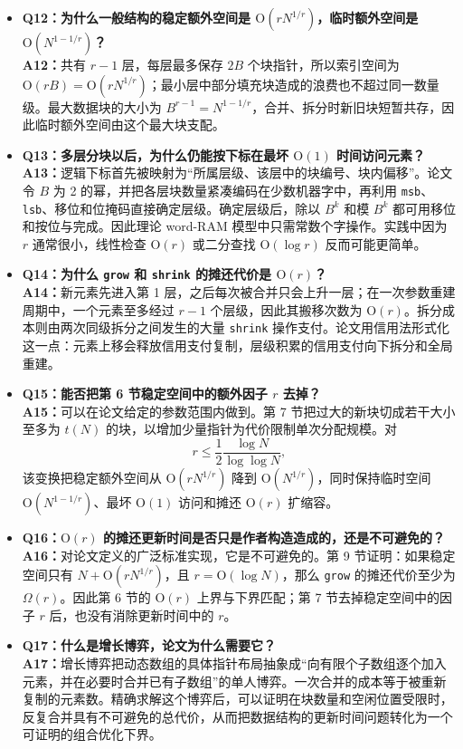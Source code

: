 \documentclass[UTF8,11pt,a4paper]{ctexart}
\newcommand{\op}[1]{\textnormal{\texttt{#1}}}
\newcommand{\Oh}{\mathrm{O}}
\begin{document}
\begin{itemize}[label={},leftmargin=0pt,itemsep=1.0em,topsep=0.5em]
  \item \textbf{Q12：为什么一般结构的稳定额外空间是 $\Oh(rN^{1/r})$，临时额外空间是 $\Oh(N^{1-1/r})$？}
  \\
  \textbf{A12：}共有 $r-1$ 层，每层最多保存 $2B$ 个块指针，所以索引空间为 $\Oh(rB)=\Oh(rN^{1/r})$；最小层中部分填充块造成的浪费也不超过同一数量级。最大数据块的大小为 $B^{r-1}=N^{1-1/r}$，合并、拆分时新旧块短暂共存，因此临时额外空间由这个最大块支配。

  \item \textbf{Q13：多层分块以后，为什么仍能按下标在最坏 $\Oh(1)$ 时间访问元素？}
  \\
  \textbf{A13：}逻辑下标首先被映射为“所属层级、该层中的块编号、块内偏移”。论文令 $B$ 为 2 的幂，并把各层块数量紧凑编码在少数机器字中，再利用 \op{msb}、\op{lsb}、移位和位掩码直接确定层级。确定层级后，除以 $B^k$ 和模 $B^k$ 都可用移位和按位与完成。因此理论 word-RAM 模型中只需常数个字操作。实践中因为 $r$ 通常很小，线性检查 $\Oh(r)$ 或二分查找 $\Oh(\log r)$ 反而可能更简单。

  \item \textbf{Q14：为什么 \op{grow} 和 \op{shrink} 的摊还代价是 $\Oh(r)$？}
  \\
  \textbf{A14：}新元素先进入第 1 层，之后每次被合并只会上升一层；在一次参数重建周期中，一个元素至多经过 $r-1$ 个层级，因此其搬移次数为 $\Oh(r)$。拆分成本则由两次同级拆分之间发生的大量 \op{shrink} 操作支付。论文用信用法形式化这一点：元素上移会释放信用支付复制，层级积累的信用支付向下拆分和全局重建。

  \item \textbf{Q15：能否把第 6 节稳定空间中的额外因子 $r$ 去掉？}
  \\
  \textbf{A15：}可以在论文给定的参数范围内做到。第 7 节把过大的新块切成若干大小至多为 $t(N)$ 的块，以增加少量指针为代价限制单次分配规模。对
  \[
    r\leq \frac{1}{2}\frac{\log N}{\log\log N},
  \]
  该变换把稳定额外空间从 $\Oh(rN^{1/r})$ 降到 $\Oh(N^{1/r})$，同时保持临时空间 $\Oh(N^{1-1/r})$、最坏 $\Oh(1)$ 访问和摊还 $\Oh(r)$ 扩缩容。

  \item \textbf{Q16：$\Oh(r)$ 的摊还更新时间是否只是作者构造造成的，还是不可避免的？}
  \\
  \textbf{A16：}对论文定义的广泛标准实现，它是不可避免的。第 9 节证明：如果稳定空间只有 $N+\Oh(rN^{1/r})$，且 $r=\Oh(\log N)$，那么 \op{grow} 的摊还代价至少为 $\Omega(r)$。因此第 6 节的 $\Oh(r)$ 上界与下界匹配；第 7 节去掉稳定空间中的因子 $r$ 后，也没有消除更新时间中的 $r$。

  \item \textbf{Q17：什么是增长博弈，论文为什么需要它？}
  \\
  \textbf{A17：}增长博弈把动态数组的具体指针布局抽象成“向有限个子数组逐个加入元素，并在必要时合并已有子数组”的单人博弈。一次合并的成本等于被重新复制的元素数。精确求解这个博弈后，可以证明在块数量和空闲位置受限时，反复合并具有不可避免的总代价，从而把数据结构的更新时间问题转化为一个可证明的组合优化下界。


\end{itemize}
\end{document}
